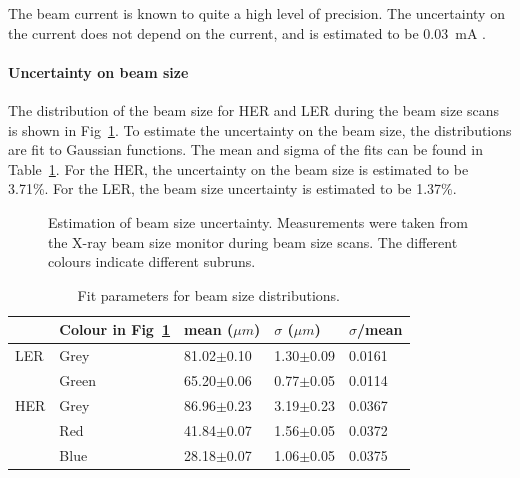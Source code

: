 	The beam current is known to quite a high level of precision. The uncertainty on the current does not depend on the current, and is estimated to be 0.03~mA \cite{HiroEmailCurrentError}.


\paragraph{Uncertainty on beam size}
	
	The distribution of the beam size for HER and LER during the beam size scans is shown in Fig~\ref{fig:BeamSizeError}. To estimate the uncertainty on the beam size, the distributions are fit to Gaussian functions. The mean and sigma of the fits can be found in Table~\ref{tab:beamSizeGausFits}. For the HER, the uncertainty on the beam size is estimated to be 3.71\%. For the LER, the beam size uncertainty is estimated to be 1.37\%.


\begin{figure}
	\centering
	\caption[Estimation of beam size uncertainty]{Estimation of beam size uncertainty. Measurements were taken from the X-ray beam size monitor during beam size scans. The different colours indicate different subruns.}	
	\label{fig:BeamSizeError}
\end{figure}


\begin{table}[htb]
	\centering
	\begin{tabular}{ lllll }
		& Colour in Fig~\ref{fig:BeamSizeError}	& mean ($\mu m$)	& $\sigma$ ($\mu m$) & $\sigma$/mean	\\ \hline \hline
	LER	& Grey	& 81.02$\pm$0.10	& 1.30$\pm$0.09	    	& 0.0161	\\
		& Green	& 65.20$\pm$0.06	& 0.77$\pm$0.05	    	& 0.0114	\\ \hline
	HER	& Grey	& 86.96$\pm$0.23	& 3.19$\pm$0.23	    	& 0.0367	\\
		& Red	& 41.84$\pm$0.07	& 1.56$\pm$0.05	    	& 0.0372	\\
		& Blue	& 28.18$\pm$0.07    	& 1.06$\pm$0.05	& 0.0375	\\ \hline
	\end{tabular}
	\caption[Fit parameters for beam size distributions]{Fit parameters for beam size distributions.}
	\label{tab:beamSizeGausFits}
\end{table}


